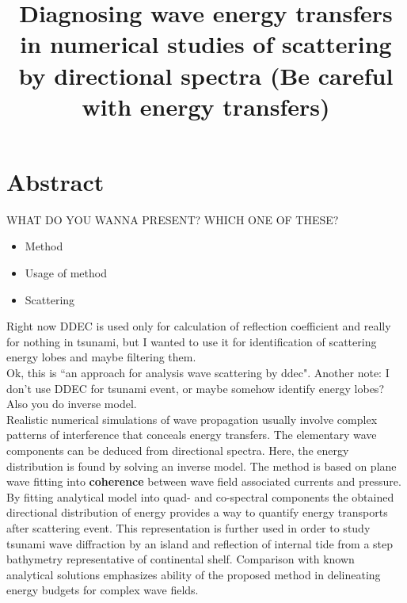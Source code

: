 



\title{Diagnosing wave energy transfers in numerical studies of scattering by directional spectra (Be careful with energy transfers)}
\maketitle

\section*{Abstract}
WHAT DO YOU WANNA PRESENT? WHICH ONE OF THESE?
\begin{itemize}
\item Method
\item Usage of method
\item Scattering
\end{itemize}
Right now DDEC is used only for calculation of reflection coefficient and really for nothing in tsunami, but I wanted to use it for identification of scattering energy lobes and maybe filtering them.\\
Ok, this is ``an approach for analysis wave scattering by ddec".
Another note: I don't use DDEC for tsunami event, or maybe somehow identify energy lobes? Also you do inverse model.\\

Realistic numerical simulations of wave propagation usually involve complex patterns of interference that conceals energy transfers. The elementary wave components can be deduced from directional spectra. Here, the energy distribution is found by solving an inverse model. The method is based on plane wave fitting into \textbf{coherence} between wave field associated currents and pressure. By fitting analytical model into quad- and co-spectral components the obtained directional distribution of energy provides a way to quantify energy transports after scattering event. This representation is further used in order to study tsunami wave diffraction by an island and reflection of internal tide from a step bathymetry representative of continental shelf. Comparison with known analytical solutions emphasizes ability of the proposed method in delineating energy budgets for complex wave fields.\\

